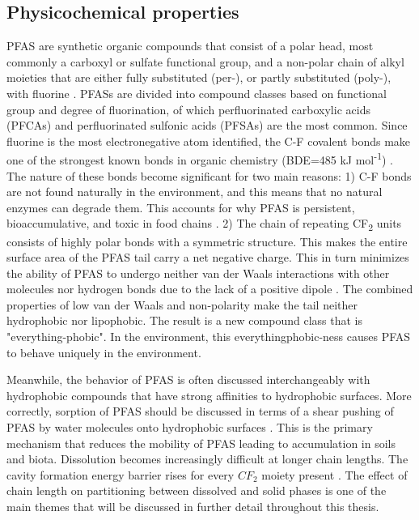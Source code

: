 \subsection{Physicochemical properties}
PFAS are synthetic organic compounds that consist of a polar head, most commonly a carboxyl or sulfate functional group, and a non-polar chain of alkyl moieties that are either fully substituted (per-), or partly substituted (poly-), with fluorine \citep{wang2011physchem}. PFASs are divided into compound classes based on functional group and degree of fluorination, of which perfluorinated carboxylic acids (PFCAs) and perfluorinated sulfonic acids (PFSAs) are the most common. Since fluorine is the most electronegative atom identified, the C-F covalent bonds make one of the strongest known bonds in organic chemistry (BDE=485 kJ mol\textsuperscript{-1}) \citep{Lau2007}. The nature of these bonds become significant for two main reasons: 1) C-F bonds are not found naturally in the environment, and this means that no natural enzymes can degrade them. This accounts for why PFAS is persistent, bioaccumulative, and toxic in food chains \citep{hale2020persistent,krafft2015per}. 2) The chain of repeating CF\textsubscript{2} units consists of highly polar bonds with a symmetric structure. This makes the  entire surface area of the PFAS tail carry a net negative charge. This in turn minimizes the ability of PFAS to undergo neither van der Waals interactions with other molecules nor hydrogen bonds due to the lack of a positive dipole \citep{Arp2006}. The combined properties of low van der Waals and non-polarity make the tail neither hydrophobic nor lipophobic. The result is a new compound class that is "everything-phobic". In the environment, this everythingphobic-ness causes PFAS to behave uniquely in the environment. 

Meanwhile, the behavior of PFAS is often discussed interchangeably with hydrophobic compounds that have strong affinities to hydrophobic surfaces. More correctly, sorption of PFAS should be discussed in terms of a shear pushing of PFAS by water molecules onto hydrophobic surfaces \citep{Arp2006}. This is the primary mechanism that reduces the mobility of PFAS leading to accumulation in soils and biota. Dissolution becomes increasingly difficult at longer chain lengths. The cavity formation energy barrier rises for every $CF_2$ moiety present \citep{bhhatarai2011,Arp2006}. The effect of chain length on partitioning between dissolved and solid phases is one of the main themes that will be discussed in further detail throughout this thesis.

